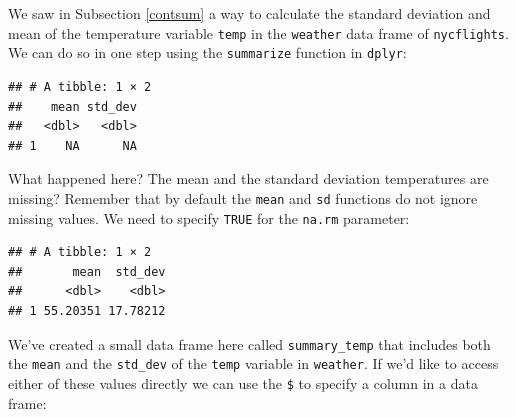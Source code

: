 \documentclass[]{tufte-book}
\newenvironment{Shaded}{\begin{snugshade}}{\end{snugshade}}
\newcommand{\KeywordTok}[1]{\textcolor[rgb]{0.13,0.29,0.53}{\textbf{{#1}}}}
\newcommand{\DataTypeTok}[1]{\textcolor[rgb]{0.13,0.29,0.53}{{#1}}}
\newcommand{\StringTok}[1]{\textcolor[rgb]{0.31,0.60,0.02}{{#1}}}
\newcommand{\OtherTok}[1]{\textcolor[rgb]{0.56,0.35,0.01}{{#1}}}
\newcommand{\NormalTok}[1]{{#1}}
\begin{document}
We saw in Subsection \ref{contsum} a way to calculate the standard
deviation and mean of the temperature variable \texttt{temp} in the
\texttt{weather} data frame of \texttt{nycflights}. We can do so in one
step using the \texttt{summarize} function in \texttt{dplyr}:

\begin{Shaded}
\end{Shaded}

\begin{verbatim}
## # A tibble: 1 × 2
##    mean std_dev
##   <dbl>   <dbl>
## 1    NA      NA
\end{verbatim}

What happened here? The mean and the standard deviation temperatures are
missing? Remember that by default the \texttt{mean} and \texttt{sd}
functions do not ignore missing values. We need to specify \texttt{TRUE}
for the \texttt{na.rm} parameter:

\begin{Shaded}
\end{Shaded}

\begin{verbatim}
## # A tibble: 1 × 2
##       mean  std_dev
##      <dbl>    <dbl>
## 1 55.20351 17.78212
\end{verbatim}

We've created a small data frame here called \texttt{summary\_temp} that
includes both the \texttt{mean} and the \texttt{std\_dev} of the
\texttt{temp} variable in \texttt{weather}. If we'd like to access
either of these values directly we can use the \texttt{\$} to specify a
column in a data frame:

\begin{Shaded}
\end{Shaded}
\end{document}
